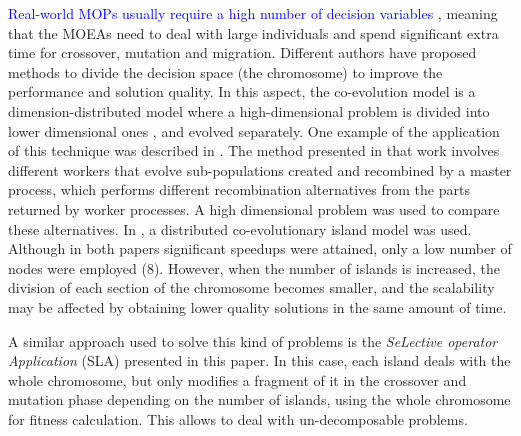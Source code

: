 \documentclass[preprint]{elsarticle}
\begin{document}
\textcolor{blue}{Real-world MOPs usually require a high number of decision variables \cite{Zhang17DECAL,XU2018268}}, 
meaning that the
MOEAs need to deal with large individuals and spend significant extra
time for crossover, mutation and migration.
Different authors have 
proposed methods to divide the decision space (the chromosome) to
improve the performance and solution quality. In this aspect, the
co-evolution model is a dimension-distributed model where a 
high-dimensional problem is divided into lower dimensional ones
\citep{Gong15models,Tonda12cooperative}, and evolved separately. One
example of the application of this technique was described in
\citep{Kimovski15Parallel}. The method presented in that work involves
different workers that evolve sub-populations created and recombined
by a master process, which performs different recombination
alternatives from the parts returned by worker processes. A high
dimensional problem was used to compare these 
alternatives. In \citep{Dorronsoro13superlinear}, a distributed
co-evolutionary island model was used.  Although in both papers
significant speedups were attained, only a low number of nodes were
employed (8). However, when the number of islands is increased, the division
of each section of the chromosome becomes smaller, and the scalability
may be affected by obtaining lower quality solutions in the same
amount of time. 








A similar approach used to solve this kind of problems is the {\em
  SeLective operator Application} (SLA) presented in this paper. In this case, each island
deals with the whole chromosome, but only modifies a fragment of it in
the crossover and mutation phase depending on the number of islands,
using the whole chromosome for fitness calculation. This allows to
deal with un-decomposable problems. 
\end{document}
